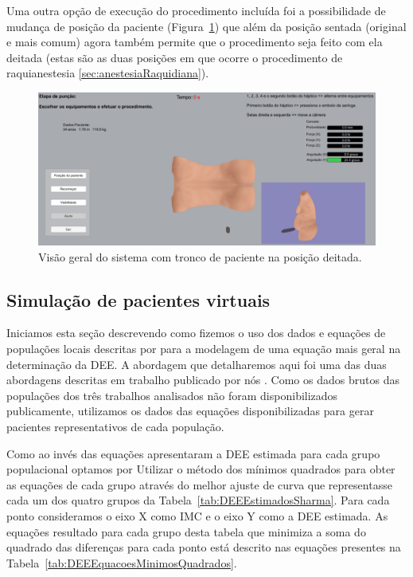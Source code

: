 Uma outra opção de execução do procedimento incluída foi a possibilidade de mudança de posição da paciente (Figura~\ref{fig:posicaoDeitada}) que além da posição sentada (original e mais comum) agora também permite que o procedimento seja feito com ela deitada (estas são as duas posições em que ocorre o procedimento de raquianestesia \ref{sec:anestesiaRaquidiana}).

\begin{figure}[ht!]
    \centering
    \includegraphics[width=0.9\linewidth]{capitulos/figuras/sistema posicao deitada.png} 
    \caption{Visão geral do sistema com tronco de paciente na posição deitada.}
    \label{fig:posicaoDeitada}
\end{figure}

\subsection {Simulação de pacientes virtuais} 
\label{sec:SimulacaoPacientesVirtuais}

Iniciamos esta seção descrevendo como fizemos o uso dos dados e equações de populações locais descritas por \textcite{Clinkscales2007, Sharma2011, Hazarika2016} para a modelagem de uma equação mais geral na determinação da \acrshort{DEE}. A abordagem que detalharemos aqui foi uma das duas abordagens descritas em trabalho publicado por nós \cite{Melo2020}.
Como os dados brutos das populações dos três trabalhos analisados não foram disponibilizados publicamente, utilizamos os dados das equações disponibilizadas para gerar pacientes representativos de cada população.

Como \textcite{Sharma2011} ao invés das equações apresentaram a \acrshort{DEE} estimada para cada grupo populacional optamos por Utilizar o método dos mínimos quadrados para obter as equações de cada grupo através do melhor ajuste de curva que representasse cada um dos quatro grupos da Tabela~\ref{tab:DEEEstimadosSharma}. Para cada ponto consideramos o eixo X como \acrshort{IMC} e o eixo Y como a \acrshort{DEE} estimada. As equações resultado para cada grupo desta tabela que minimiza a soma do quadrado das diferenças para cada ponto está descrito nas equações presentes na Tabela~\ref{tab:DEEEquacoesMinimosQuadrados}.

